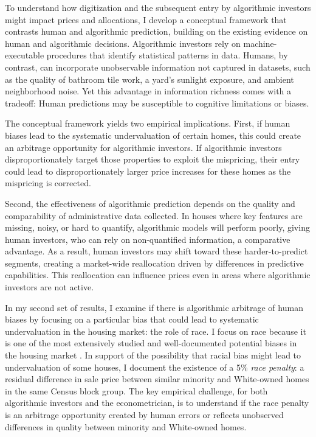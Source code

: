 \documentclass[11pt]{article}
\begin{document}
To understand how digitization and the subsequent entry by algorithmic investors might impact prices and allocations, I develop a conceptual framework that contrasts human and algorithmic prediction, building on the existing evidence on human and algorithmic decisions. Algorithmic investors rely on machine-executable procedures that identify statistical patterns in data. Humans, by contrast, can incorporate unobservable information not captured in datasets, such as the quality of bathroom tile work, a yard's sunlight exposure, and ambient neighborhood noise. Yet this advantage in information richness comes with a tradeoff: Human predictions may be susceptible to cognitive limitations or biases.

The conceptual framework yields two empirical implications. First, if human biases lead to the systematic undervaluation of certain homes, this could create an arbitrage opportunity for algorithmic investors. If algorithmic investors disproportionately target those properties to exploit the mispricing, their entry could lead to disproportionately larger price increases for these homes as the mispricing is corrected. 

Second, the effectiveness of algorithmic prediction depends on the quality and comparability of administrative data collected. In houses where key features are missing, noisy, or hard to quantify, algorithmic models will perform poorly, giving human investors, who can rely on non-quantified information, a comparative advantage. As a result, human investors may shift toward these harder-to-predict segments, creating a market-wide reallocation driven by differences in predictive capabilities. This reallocation can influence prices even in areas where algorithmic investors are not active.



In my second set of results, I examine if there is algorithmic arbitrage of human biases by focusing on a particular bias that could lead to systematic undervaluation in the housing market: the role of race. I focus on race because it is one of the most extensively studied and well-documented potential biases in the housing market \citep[e.g.,][]{elsterMinoritiesPropertyValues2022, perryDEVALUATIONASSETSBLACK, freddiemac2021, cutlerRiseDeclineAmerican1999, box-couillard_racial_2024}. In support of the possibility that racial bias might lead to undervaluation of some houses, I document the existence of a 5\% \textit{race penalty}: a residual difference in sale price between similar minority and White-owned homes in the same Census block group. The key empirical challenge, for both algorithmic investors and the econometrician, is to understand if the race penalty is an arbitrage opportunity created by human errors or reflects unobserved differences in quality between minority and White-owned homes. 
\end{document}

